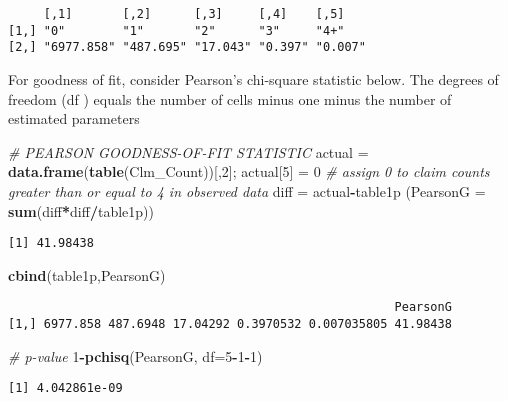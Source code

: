 \documentclass[]{book}
\newenvironment{Shaded}{\begin{snugshade}}{\end{snugshade}}
\newcommand{\KeywordTok}[1]{\textcolor[rgb]{0.13,0.29,0.53}{\textbf{#1}}}
\newcommand{\DataTypeTok}[1]{\textcolor[rgb]{0.13,0.29,0.53}{#1}}
\newcommand{\DecValTok}[1]{\textcolor[rgb]{0.00,0.00,0.81}{#1}}
\newcommand{\StringTok}[1]{\textcolor[rgb]{0.31,0.60,0.02}{#1}}
\newcommand{\CommentTok}[1]{\textcolor[rgb]{0.56,0.35,0.01}{\textit{#1}}}
\newcommand{\OperatorTok}[1]{\textcolor[rgb]{0.81,0.36,0.00}{\textbf{#1}}}
\newcommand{\NormalTok}[1]{#1}
\theoremstyle{definition}
\theoremstyle{definition}
\theoremstyle{definition}
\theoremstyle{remark}
\begin{document}
\begin{verbatim}
     [,1]       [,2]      [,3]     [,4]    [,5]   
[1,] "0"        "1"       "2"      "3"     "4+"   
[2,] "6977.858" "487.695" "17.043" "0.397" "0.007"
\end{verbatim}

For goodness of fit, consider Pearson's chi-square statistic below. The
degrees of freedom (df ) equals the number of cells minus one minus the
number of estimated parameters

\begin{Shaded}
\begin{Highlighting}[]
\CommentTok{#  PEARSON GOODNESS-OF-FIT STATISTIC}
\NormalTok{actual =}\StringTok{ }\KeywordTok{data.frame}\NormalTok{(}\KeywordTok{table}\NormalTok{(Clm_Count))[,}\DecValTok{2}\NormalTok{];}
\NormalTok{actual[}\DecValTok{5}\NormalTok{] =}\StringTok{ }\DecValTok{0}  \CommentTok{# assign 0 to claim counts greater than or equal to 4 in observed data}
\NormalTok{diff =}\StringTok{ }\NormalTok{actual}\OperatorTok{-}\NormalTok{table1p}
\NormalTok{(}\DataTypeTok{PearsonG =} \KeywordTok{sum}\NormalTok{(diff}\OperatorTok{*}\NormalTok{diff}\OperatorTok{/}\NormalTok{table1p))}
\end{Highlighting}
\end{Shaded}

\begin{verbatim}
[1] 41.98438
\end{verbatim}

\begin{Shaded}
\begin{Highlighting}[]
\KeywordTok{cbind}\NormalTok{(table1p,PearsonG)}
\end{Highlighting}
\end{Shaded}

\begin{verbatim}
                                                      PearsonG
[1,] 6977.858 487.6948 17.04292 0.3970532 0.007035805 41.98438
\end{verbatim}

\begin{Shaded}
\begin{Highlighting}[]
\CommentTok{#  p-value}
\DecValTok{1}\OperatorTok{-}\KeywordTok{pchisq}\NormalTok{(PearsonG, }\DataTypeTok{df=}\DecValTok{5}\OperatorTok{-}\DecValTok{1}\OperatorTok{-}\DecValTok{1}\NormalTok{)}
\end{Highlighting}
\end{Shaded}

\begin{verbatim}
[1] 4.042861e-09
\end{verbatim}
\end{document}
